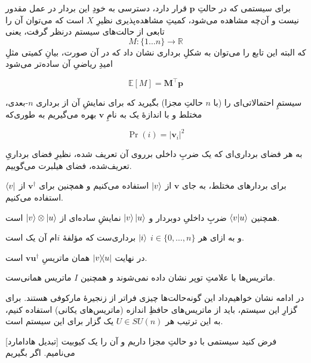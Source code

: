 \documentclass[a4paper,12pt]{article}
\begin{document}

برای سیستمی که در حالتِ 
\(\mathbf{p}\)
قرار دارد، دسترسی به خودِ این بردار در عمل مقدور نیست و آن‌چه مشاهده می‌شود، کمیتِ مشاهده‌پذیری نظیرِ 
\( X \)
است که می‌توان آن را تابعی از حالت‌های سیستم درنظر گرفت، یعنی
\begin{equation} M : \{ 1 \dots n \} \to \mathbb{R} \end{equation}
که البته این تابع را می‌توان به شکلِ برداری نشان داد که در آن صورت، بیانِ کمیتی مثلِ امیدِ ریاضیِ آن ساده‌تر می‌شود

\begin{equation} \mathbb{E}[M] = \mathbf{M}^\intercal \mathbf{p} \end{equation}

سیستمِ احتمالاتی‌ای را (با \( n \) حالتِ مجزا) بگیرید که برای نمایشِ آن از برداری \( n \)-بعدی، مختلط و با اندازهٔ یک  به نامِ 
\(\mathbf{v}\)
بهره می‌گیریم به طوری‌که

\begin{equation} \Pr(i) = |\mathbf{v}_i|^2\end{equation}

به هر فضای برداری‌ای که یک ضربِ داخلی برروی آن تعریف شده، نظیرِ فضای برداریِ تعریف‌شده، فضای هیلبرت می‌گوییم.

برای بردارهای مختلط، به جای 
\(\mathbf{v}\)
از
\(\ket{v}\)
استفاده می‌کنیم و همچنین برای
\(\mathbf{v}^\dagger\)
از 
\(\bra{v}\)
استفاده می‌کنیم.

همچنین
\(\braket{v}{u}\)
ضربِ داخلیِ دوبردار و 
\(\ket{v}\ket{u}\)
نمایشِ ساده‌ای از
\(\ket{v}\otimes\ket{u}\)
است.

و به ازای هر 
\(i \in \{ 0, \dots , n \}\)
\(\ket{i}\)
برداری‌ست که مؤلفهٔ \(i\)ام آن یک است.

در نهایت
\(\dyad{v}{u}\)
همان ماتریسِ
\(\mathbf{v}\mathbf{u}^\dagger\)
است.

ماتریس‌ها با علامتِ توپر نشان داده نمی‌شوند و همچنین \(I\) ماتریس همانی‌ست.


در ادامه نشان خواهیم‌داد این گونه‌حالت‌ها چیزی فراتر از زنجیرهٔ مارکوفی هستند.
برای گزارِ این سیستم، باید از ماتریس‌های حافظِ اندازه (ماتریس‌های یکانی) استفاده کنیم، به این ترتیب هر 
\(U \in SU(n)\)
یک گزار برای این سیستم است.

[تبدیل هادامارد]
فرض کنید سیستمی با دو حالتِ مجزا داریم و آن را یک کیوبیت می‌نامیم.
اگر بگیریم
\end{document}
